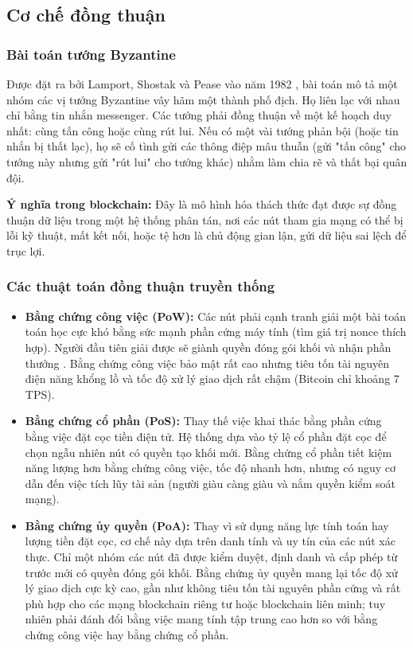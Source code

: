 \documentclass[12pt,a4paper]{article}
\begin{document}
\subsection{Cơ chế đồng thuận}

\subsubsection{Bài toán tướng Byzantine}
Được đặt ra bởi Lamport, Shostak và Pease vào năm 1982 \cite{lamport}, bài toán mô tả một nhóm các vị tướng Byzantine vây hãm một thành phố địch. Họ liên lạc với nhau chỉ bằng tin nhắn messenger. Các tướng phải đồng thuận về một kế hoạch duy nhất: cùng tấn công hoặc cùng rút lui. Nếu có một vài tướng phản bội (hoặc tin nhắn bị thất lạc), họ sẽ cố tình gửi các thông điệp mâu thuẫn (gửi "tấn công" cho tướng này nhưng gửi "rút lui" cho tướng khác) nhằm làm chia rẽ và thất bại quân đội.

\textbf{Ý nghĩa trong blockchain:} Đây là mô hình hóa thách thức đạt được sự đồng thuận dữ liệu trong một hệ thống phân tán, nơi các nút tham gia mạng có thể bị lỗi kỹ thuật, mất kết nối, hoặc tệ hơn là chủ động gian lận, gửi dữ liệu sai lệch để trục lợi.

\subsubsection{Các thuật toán đồng thuận truyền thống}
\begin{itemize}
    \item \textbf{Bằng chứng công việc (PoW):} Các nút phải cạnh tranh giải một bài toán toán học cực khó bằng sức mạnh phần cứng máy tính (tìm giá trị nonce thích hợp). Người đầu tiên giải được sẽ giành quyền đóng gói khối và nhận phần thưởng \cite{antonopoulos}. Bằng chứng công việc bảo mật rất cao nhưng tiêu tốn tài nguyên điện năng khổng lồ và tốc độ xử lý giao dịch rất chậm (Bitcoin chỉ khoảng 7 TPS).
    \item \textbf{Bằng chứng cổ phần (PoS):} Thay thế việc khai thác bằng phần cứng bằng việc đặt cọc tiền điện tử. Hệ thống dựa vào tỷ lệ cổ phần đặt cọc để chọn ngẫu nhiên nút có quyền tạo khối mới. Bằng chứng cổ phần tiết kiệm năng lượng hơn bằng chứng công việc, tốc độ nhanh hơn, nhưng có nguy cơ dẫn đến việc tích lũy tài sản (người giàu càng giàu và nắm quyền kiểm soát mạng).
    \item \textbf{Bằng chứng ủy quyền (PoA):} Thay vì sử dụng năng lực tính toán hay lượng tiền đặt cọc, cơ chế này dựa trên danh tính và uy tín của các nút xác thực. Chỉ một nhóm các nút đã được kiểm duyệt, định danh và cấp phép từ trước mới có quyền đóng gói khối. Bằng chứng ủy quyền mang lại tốc độ xử lý giao dịch cực kỳ cao, gần như không tiêu tốn tài nguyên phần cứng và rất phù hợp cho các mạng blockchain riêng tư hoặc blockchain liên minh; tuy nhiên phải đánh đổi bằng việc mang tính tập trung cao hơn so với bằng chứng công việc hay bằng chứng cổ phần.
\end{itemize}
\end{document}
